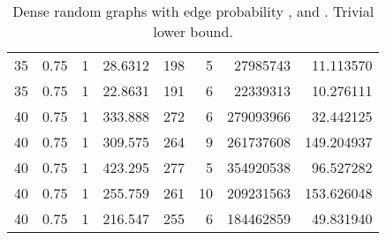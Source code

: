 \documentclass[a4paper,11pt]{article}
\begin{document}
\begin{table}
\begin{center}
\begin{tabular}{|rrr|r|r|rr|r|}
35 & 0.75 & 1 & 28.6312 & 198 & 5 & 27985743 & 11.113570 \\
35 & 0.75 & 1 & 22.8631 & 191 & 6 & 22339313 & 10.276111 \\
40 & 0.75 & 1 & 333.888 & 272 & 6 & 279093966 & 32.442125 \\
40 & 0.75 & 1 & 309.575 & 264 & 9 & 261737608 & 149.204937 \\
40 & 0.75 & 1 & 423.295 & 277 & 5 & 354920538 & 96.527282 \\
40 & 0.75 & 1 & 255.759 & 261 & 10 & 209231563 & 153.626048 \\
40 & 0.75 & 1 & 216.547 & 255 & 6 & 184462859 & 49.831940 \\
\hline
\end{tabular}
\end{center}
\caption{Dense random graphs with edge probability ,
   and . Trivial lower bound.}
\label{tab:dense-norebal}
\end{table}
\end{document}
